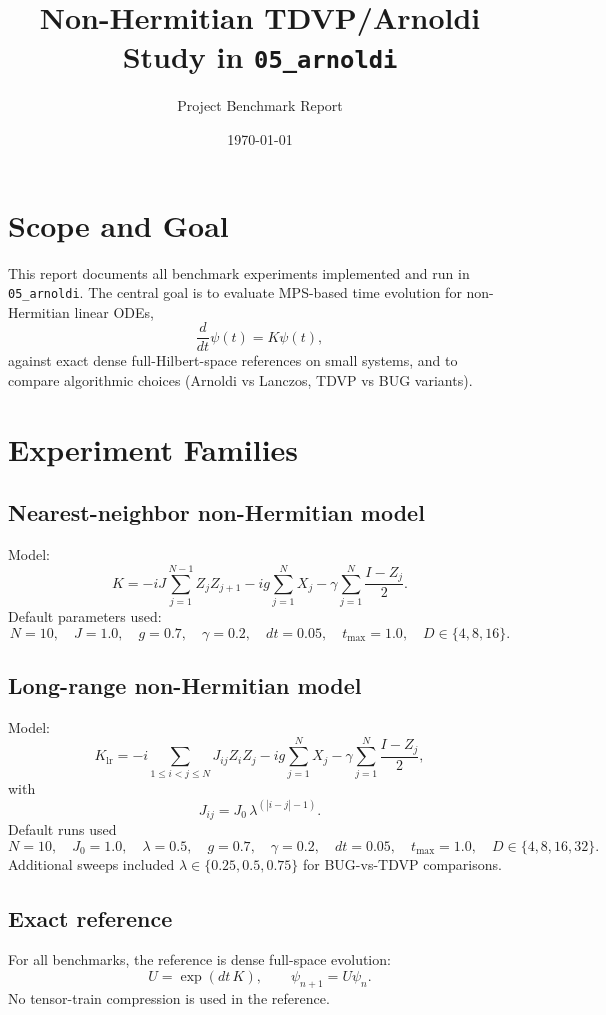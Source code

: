 \documentclass[11pt]{article}
\title{Non-Hermitian TDVP/Arnoldi Study in \texttt{05\_arnoldi}}
\author{Project Benchmark Report}
\date{\today}
\begin{document}
\maketitle

\section{Scope and Goal}
This report documents all benchmark experiments implemented and run in \texttt{05\_arnoldi}. The central goal is to evaluate MPS-based time evolution for non-Hermitian linear ODEs,
\begin{equation}
\frac{d}{dt}\psi(t)=K\psi(t),
\end{equation}
against exact dense full-Hilbert-space references on small systems, and to compare algorithmic choices (Arnoldi vs Lanczos, TDVP vs BUG variants).

\section{Experiment Families}
\subsection{Nearest-neighbor non-Hermitian model}
Model:
\begin{equation}
K=-iJ\sum_{j=1}^{N-1} Z_jZ_{j+1} - ig\sum_{j=1}^{N}X_j - \gamma\sum_{j=1}^{N}\frac{I-Z_j}{2}.
\end{equation}
Default parameters used:
\[
N=10,\quad J=1.0,\quad g=0.7,\quad \gamma=0.2,\quad dt=0.05,\quad t_{\max}=1.0,\quad D\in\{4,8,16\}.
\]

\subsection{Long-range non-Hermitian model}
Model:
\begin{equation}
K_{\mathrm{lr}}=-i\sum_{1\le i<j\le N}J_{ij}Z_iZ_j - ig\sum_{j=1}^{N}X_j - \gamma\sum_{j=1}^{N}\frac{I-Z_j}{2},
\end{equation}
with
\begin{equation}
J_{ij}=J_0\,\lambda^{(|i-j|-1)}.
\end{equation}
Default runs used
\[
N=10,\quad J_0=1.0,\quad \lambda=0.5,\quad g=0.7,\quad \gamma=0.2,\quad dt=0.05,\quad t_{\max}=1.0,\quad D\in\{4,8,16,32\}.
\]
Additional sweeps included \(\lambda\in\{0.25,0.5,0.75\}\) for BUG-vs-TDVP comparisons.

\subsection{Exact reference}
For all benchmarks, the reference is dense full-space evolution:
\[
U=\exp(dt\,K),\qquad \psi_{n+1}=U\psi_n.
\]
No tensor-train compression is used in the reference.
\end{document}

